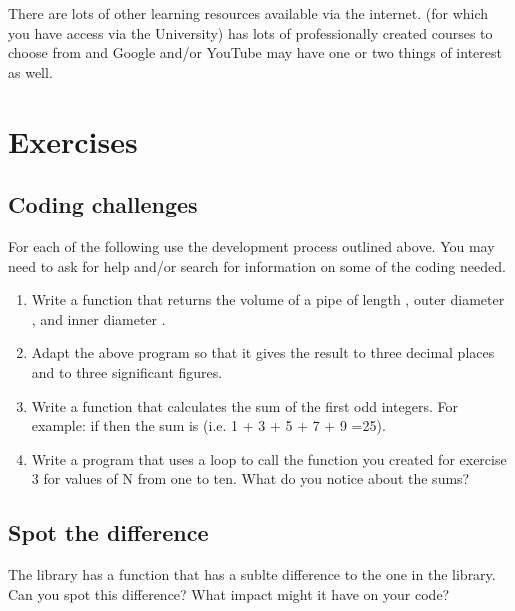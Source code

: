 \documentclass[letterpaper,10pt,english]{jupyterBook}
\begin{document}
\sphinxAtStartPar
There are lots of other learning resources available via the internet.  (for which you have access via the University) has lots of professionally created courses to choose from and Google and/or YouTube may have one or two things of interest as well.


\section{Exercises}
\label{\detokenize{ProgInPython:exercises}}

\subsection{Coding challenges}
\label{\detokenize{ProgInPython:coding-challenges}}
\sphinxAtStartPar
For each of the following use the development process outlined above. You may need to ask for help and/or search for information on some of the coding needed.
\begin{enumerate}
%
\item {} 
\sphinxAtStartPar
Write a function that returns the volume of a pipe of length , outer diameter , and inner diameter .

\item {} 
\sphinxAtStartPar
Adapt the above program so that it gives the result to three decimal places and to three significant figures.

\item {} 
\sphinxAtStartPar
Write  a function that calculates the sum of the first  odd integers. For example: if  then the sum is  (i.e. 1 + 3 + 5 + 7 + 9 =25).

\item {} 
\sphinxAtStartPar
Write a program that uses a loop to call the function you created for exercise 3 for values of N from one to ten. What do you notice about the sums?

\end{enumerate}


\subsection{Spot the difference}
\label{\detokenize{ProgInPython:spot-the-difference}}
\sphinxAtStartPar
The  library has a  function that has a sublte difference to the one in the  library. Can you spot this difference? What impact might it have on your code?
\end{document}
